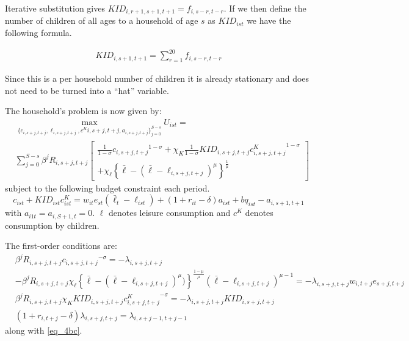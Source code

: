 \documentclass[letterpaper,12pt]{article}
\theoremstyle{definition}
\numberwithin{equation}{section}
\begin{document}
\begin{spacing}{1.5}
	Iterative substitution gives $KID_{i,r+1,s+1,t+1} = f_{i,s-r,t-r}$.  If we then define the number of children of all ages to a household of age $s$ as $KID_{ist}$ we have the following formula.

	\begin{align}
		KID_{i,s+1,t+1} = \sum_{r=1}^{20} f_{i,s-r,t-r}
	\end{align}

	Since this is a per household number of children it is already stationary and does not need to be turned into a ``hat'' variable.

	The household's problem is now given by:
	\begin{equation}
		\begin{split}
		& \max_{\{c_{i,s+j,t+j},\ell_{i,s+j,t+j},c^K{i,s+j,t+j},a_{i,s+j,t+j}\}_{j=0}^{S-s}} U_{ist} = \\
		& \sum_{j=0}^{S-s} \beta^j R_{i,s+j,t+j} \begin{bmatrix} \frac{1}{1-\sigma} {c_{i,s+j,t+j}}^{1-\sigma} + \chi_K \frac{1}{1-\sigma} KID_{i,s+j,t+j}{c^K_{i,s+j,t+j}}^{1-\sigma} \\ + \chi_\ell \left\{ \bar \ell - (\bar \ell-\ell_{i,s+j,t+j})^\mu \right\}^{\frac{1}{\mu}} \end{bmatrix} \nonumber
		\end{split}
	\end{equation}
	subject to the following budget constraint each period.
	\begin{equation} \label{eq_4bc}
		c_{ist} + KID_{ist}c^K_{ist} = w_{it} e_{st} (\bar \ell_t -\ell_{ist}) + (1+r_{it}-\delta)a_{ist} + bq_{ist} - a_{i,s+1,t+1}
	\end{equation}
	with $a_{i1t} = a_{i,S+1,t} = 0$.  $\ell$ denotes leisure consumption and $c^K$ denotes consumption by children.

	The first-order conditions are:
	\begin{align}
		& \beta^j R_{i,s+j,t+j} {c_{i,s+j,t+j}}^{-\sigma} =  - \lambda_{i,s+j,t+j}  \label{eq_4foc1} \\
		& - \beta^j R_{i,s+j,t+j} \chi_\ell \left\{ \bar \ell - (\bar \ell-\ell_{i,s+j,t+j})^\mu) \right\}^{\frac{1-\mu}{\mu}}(\bar \ell-\ell_{i,s+j,t+j})^{\mu-1}  = - \lambda_{i,s+j,t+j} w_{i,t+j} e_{s+j,t+j} \label{eq_4foc2} \\
		& \beta^j R_{i,s+j,t+j} \chi_K KID_{i,s+j,t+j}{c^K_{i,s+j,t+j}}^{-\sigma} = - \lambda_{i,s+j,t+j} KID_{i,s+j,t+j} \label{eq_4foc3} \\
        & (1+r_{i,t+j}-\delta) \lambda_{i,s+j,t+j} = \lambda_{i,s+j-1,t+j-1} \label{eq_4foc4}
	\end{align}	
	along with \eqref{eq_4bc}.


\end{spacing}
\end{document}
